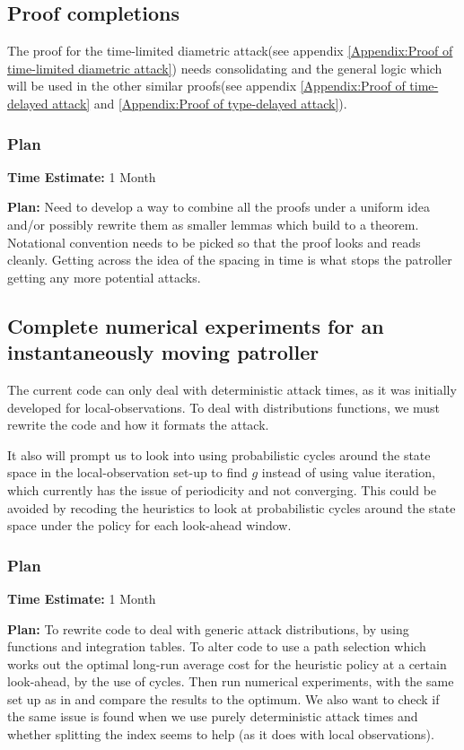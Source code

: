 \documentclass[a4paper,10pt]{article}
\theoremstyle{definition}
\theoremstyle{definition}
\theoremstyle{remark}
\theoremstyle{definition}
\begin{document}
\subsection{Proof completions}
\label{Section:Proof completions}
The proof for the time-limited diametric attack(see appendix \ref{Appendix:Proof of time-limited diametric attack}) needs consolidating and the general logic which will be used in the other similar proofs(see appendix \ref{Appendix:Proof of time-delayed attack} and \ref{Appendix:Proof of type-delayed attack}).

\subsubsection{Plan}
\textbf{Time Estimate:} 1 Month

\textbf{Plan:} Need to develop a way to combine all the proofs under a uniform idea and/or possibly rewrite them as smaller lemmas which build to a theorem. Notational convention needs to be picked so that the proof looks and reads cleanly. Getting across the idea of the spacing in time is what stops the patroller getting any more potential attacks.

\subsection{Complete numerical experiments for an instantaneously moving patroller}
\label{Section:Complete Numerical experiments for an instantaneously moving patroller}
The current code can only deal with deterministic attack times, as it was initially developed for local-observations. To deal with distributions functions, we must rewrite the code and how it formats the attack.

It also will prompt us to look into using probabilistic cycles around the state space in the local-observation set-up to find $g$ instead of using value iteration, which currently has the issue of periodicity and not converging. This could be avoided by recoding the heuristics to look at probabilistic cycles around the state space under the policy for each look-ahead window.

\subsubsection{Plan}
\textbf{Time Estimate:} 1 Month

\textbf{Plan:} To rewrite code to deal with generic attack distributions, by using functions and integration tables. To alter code to use a path selection which works out the optimal long-run average cost for the heuristic policy at a certain look-ahead, by the use of cycles. Then run numerical experiments, with the same set up as in \citep{Lin2013} and compare the results to the optimum. We also want to check if the same issue is found when we use purely deterministic attack times and whether splitting the index seems to help (as it does with local observations).
\end{document}
